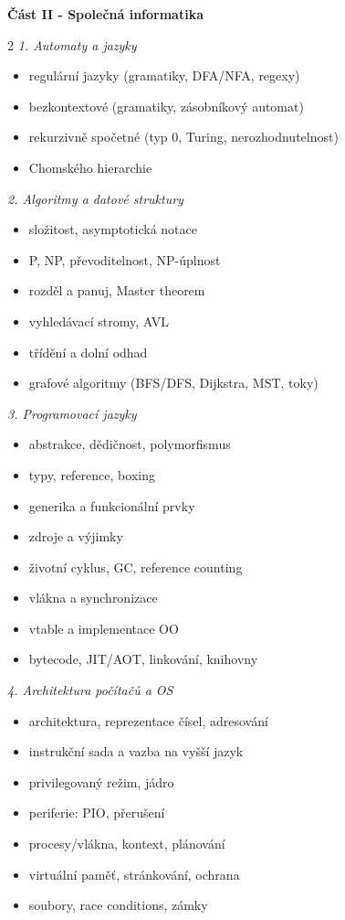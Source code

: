 \textbf{Část II - Společná informatika}
\begin{multicols}{2}\small
\textit{1. Automaty a jazyky}
\begin{itemize}[label=\checkmark,leftmargin=1.3em,itemsep=0pt]
  \item regulární jazyky (gramatiky, DFA/NFA, regexy)
  \item bezkontextové (gramatiky, zásobníkový automat)
  \item rekurzivně spočetné (typ 0, Turing, nerozhodnutelnost)
  \item Chomského hierarchie
\end{itemize}
\textit{2. Algoritmy a datové struktury}
\begin{itemize}[label=\checkmark,leftmargin=1.3em,itemsep=0pt]
  \item složitost, asymptotická notace
  \item P, NP, převoditelnost, NP-úplnost
  \item rozděl a panuj, Master theorem
  \item vyhledávací stromy, AVL
  \item třídění a dolní odhad
  \item grafové algoritmy (BFS/DFS, Dijkstra, MST, toky)
\end{itemize}
\textit{3. Programovací jazyky}
\begin{itemize}[label=\checkmark,leftmargin=1.3em,itemsep=0pt]
  \item abstrakce, dědičnost, polymorfismus
  \item typy, reference, boxing
  \item generika a funkcionální prvky
  \item zdroje a výjimky
  \item životní cyklus, GC, reference counting
  \item vlákna a synchronizace
  \item vtable a implementace OO
  \item bytecode, JIT/AOT, linkování, knihovny
\end{itemize}
\textit{4. Architektura počítačů a OS}
\begin{itemize}[label=\checkmark,leftmargin=1.3em,itemsep=0pt]
  \item architektura, reprezentace čísel, adresování
  \item instrukční sada a vazba na vyšší jazyk
  \item privilegovaný režim, jádro
  \item periferie: PIO, přerušení
  \item procesy/vlákna, kontext, plánování
  \item virtuální paměť, stránkování, ochrana
  \item soubory, race conditions, zámky
\end{itemize}
\end{multicols}


